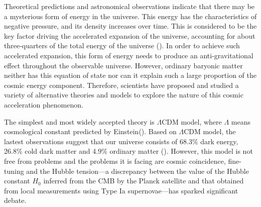 \documentclass[preprint]{aastex631}
\begin{document}
Theoretical predictions and astronomical observations indicate that there may be a mysterious form of energy in the universe. This energy has the characteristics of negative pressure, and its density increases over time. This is considered to be the key factor driving the accelerated expansion of the universe, accounting for about three-quarters of the total energy of the universe (\cite{PhysRevD.37.3406,PhysRevD.63.103510,10.1143/PTP.106.929}). In order to achieve such accelerated expansion, this form of energy needs to produce an anti-gravitational effect throughout the observable universe. However, ordinary baryonic matter neither has this equation of state nor can it explain such a large proportion of the cosmic energy component. Therefore, scientists have proposed and studied a variety of alternative theories and models to explore the nature of this cosmic acceleration phenomenon.

The simplest and most widely accepted theory is $\Lambda \text{CDM}$ model, where $\Lambda$ means cosmological constant predicted by Einstein(\cite{Carroll_2001}).
Based on $\Lambda \text{CDM}$ model, the lastest observations suggest that our universe consists of 68.3\% dark energy, 26.8\% cold dark matter and 4.9\% ordinary matter (\cite{2020Planck}). However, this model is not free from problems and the problems it is facing are cosmic coincidence, fine-tuning and the Hubble tension—a discrepancy between the value of the Hubble constant $H_0$ inferred from the CMB by the Planck satellite and that obtained from local measurements using Type Ia supernovae—has sparked significant debate. 
\end{document}
